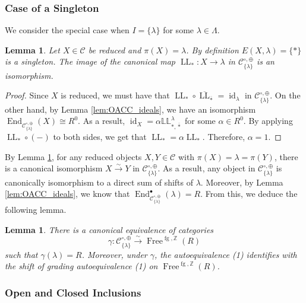 \documentclass{amsart}
\newcommand{\Z}{\mathbb{Z}}
\newcommand{\scrC}{\mathcal{C}}
\DeclareMathOperator{\End}{End}
\DeclareMathOperator{\Free}{Free}
\DeclareMathOperator{\id}{id}
\DeclareMathOperator{\fg}{fg}
\DeclareMathOperator{\LL}{LL}
\newcommand{\dLL}{\mathbb{L}\mathbb{L}}
\newtheorem{lemma}[subsubsection]{Lemma}
\theoremstyle{definition}
\numberwithin{equation}{subsection}
\begin{document}
\subsubsection{Case of a Singleton}

We consider the special case when $I = \{\lambda\}$ for some $\lambda \in \Lambda$.

\begin{lemma}\label{lem:singleton_identification}
    Let $X \in \scrC$ be reduced and $\pi (X) = \lambda$. By definition $E (X,\lambda) = \{*\}$ is a singleton. 
    The image of the canonical map $\LL_* : X \to \lambda$ in $\scrC_{\{\lambda\}}^{\circ, \oplus}$ is an isomorphism.
\end{lemma}
\begin{proof}
   Since $X$ is reduced, we must have that $\LL_* \circ \overline{\LL}_{\overline{*}} = \id_{\lambda}$ in $\scrC_{\{\lambda\}}^{\circ, \oplus}$.
   On the other hand, by Lemma \ref{lem:OACC_ideals}, we have an isomorphism $\End_{\scrC_{\{\lambda\}}^{\circ, \oplus}} (X) \cong R^0$.
   As a result, $\id_X = \alpha \dLL_{*, \overline{*}}^{\lambda}$ for some $\alpha \in R^0$. 
   By applying $\LL_{*} \circ (-)$ to both sides, we get that $\LL_* = \alpha \LL_{*}$. Therefore, $\alpha = 1$.
\end{proof}

By Lemma \ref{lem:singleton_identification}, for any reduced objects $X, Y \in \scrC$ with $\pi (X) = \lambda = \pi (Y)$, there is a canonical isomorphism $X \stackrel{\sim}{\to} Y$ in $\scrC_{\{\lambda\}}^{\circ, \oplus}$.
As a result, any object in $\scrC_{\{\lambda\}}^{\circ, \oplus}$ is canonically isomorphism to a direct sum of shifts of $\lambda$.
Moreover, by Lemma \ref{lem:OACC_ideals}, we know that $\End_{\scrC_{\{\lambda\}}^{\circ, \oplus}}^{\bullet} (\lambda) = R$.
From this, we deduce the following lemma.

\begin{lemma}\label{lem:single_stratum_equivalence}
    There is a canonical equivalence of categories
    \[\gamma : \scrC_{\{\lambda\}}^{\circ, \oplus} \stackrel{\sim}{\to} \Free^{\fg, \Z} (R)\]
    such that $\gamma (\lambda) = R$. Moreover, under $\gamma$, the autoequivalence (1) identifies with the shift of grading autoequivalence (1) on $\Free^{\fg, \Z} (R)$.
\end{lemma}

\subsubsection{Open and Closed Inclusions}
\end{document}
